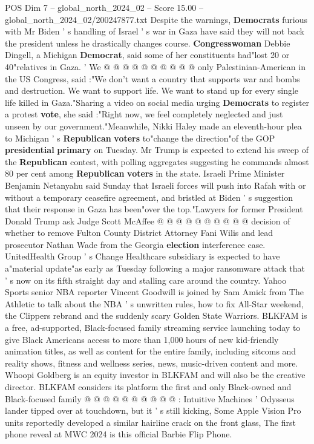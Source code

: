 \begin{textsample}{POS Dim 7 – global\_north\_2024\_02 – Score 15.00 – global\_north\_2024\_02/200247877.txt}
Despite the warnings, \textbf{Democrats} furious with Mr Biden ' s handling of Israel ' s war in Gaza have said they will not back the president unless he drastically changes course. \textbf{Congresswoman} Debbie Dingell, a Michigan \textbf{Democrat}, said some of her constituents had"lost 20 or 40"relatives in Gaza. ' We @ @ @ @ @ @ @ @ @ @ only Palestinian-American in the US Congress, said :"We don't want a country that supports war and bombs and destruction.
We want to support life.
We want to stand up for every single life killed in Gaza."Sharing a video on social media urging \textbf{Democrats} to register a protest \textbf{vote}, she said :"Right now, we feel completely neglected and just unseen by our government."Meanwhile, Nikki Haley made an eleventh-hour plea to Michigan ' s \textbf{Republican} \textbf{voters} to"change the direction"of the GOP \textbf{presidential} \textbf{primary} on Tuesday.
Mr Trump is expected to extend his sweep of the \textbf{Republican} contest, with polling aggregates suggesting he commands almost 80 per cent among \textbf{Republican} \textbf{voters} in the state.
Israeli Prime Minister Benjamin Netanyahu said Sunday that Israeli forces will push into Rafah with or without a temporary ceasefire agreement, and bristled at Biden ' s suggestion that their response in Gaza has been"over the top."Lawyers for former President Donald Trump ask Judge Scott McAffee @ @ @ @ @ @ @ @ @ @ decision of whether to remove Fulton County District Attorney Fani Wilis and lead prosecutor Nathan Wade from the Georgia \textbf{election} interference case.
UnitedHealth Group ' s Change Healthcare subsidiary is expected to have a"material update"as early as Tuesday following a major ransomware attack that ' s now on its fifth straight day and stalling care around the country.
Yahoo Sports senior NBA reporter Vincent Goodwill is joined by Sam Amick from The Athletic to talk about the NBA ' s unwritten rules, how to fix All-Star weekend, the Clippers rebrand and the suddenly scary Golden State Warriors.
BLKFAM is a free, ad-supported, Black-focused family streaming service launching today to give Black Americans access to more than 1,000 hours of new kid-friendly animation titles, as well as content for the entire family, including sitcoms and reality shows, fitness and wellness series, news, music-driven content and more.
Whoopi Goldberg is an equity investor in BLKFAM and will also be the creative director.
BLKFAM considers its platform the first and only Black-owned and Black-focused family @ @ @ @ @ @ @ @ @ @ : Intuitive Machines ' Odysseus lander tipped over at touchdown, but it ' s still kicking, Some Apple Vision Pro units reportedly developed a similar hairline crack on the front glass, The first phone reveal at MWC 2024 is this official Barbie Flip Phone.

\end{textsample}
